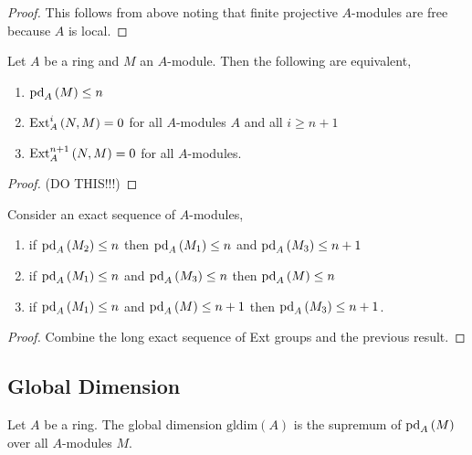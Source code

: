 \documentclass[12pt]{article}
\begin{document}
\begin{proof}
This follows from above noting that finite projective $A$-modules are free because $A$ is local.
\end{proof}

\begin{prop}
Let $A$ be a ring and $M$ an $A$-module. Then the following are equivalent,
\begin{enumerate}
\item $\mathrm{pd}_{A} \left( M \right) \le n$
\item $\mathrm{Ext}^{i}_{A} \left( N, M \right) = 0$ for all $A$-modules $A$ and all $i \ge n + 1$
\item $\mathrm{Ext}^{n+1}_{A} \left( N, M \right) = 0$ for all $A$-modules.
\end{enumerate}
\end{prop}

\begin{proof}
(DO THIS!!!)
\end{proof}

\begin{lemma}
Consider an exact sequence of $A$-modules,
\begin{center}
\end{center}
\begin{enumerate}
\item if $\mathrm{pd}_{A} \left( M_2 \right) \le n$ then $\mathrm{pd}_{A} \left( M_1 \right) \le n$ and $\mathrm{pd}_{A} \left( M_3 \right) \le n + 1$
\item if $\mathrm{pd}_{A} \left( M_1 \right) \le n$ and $\mathrm{pd}_{A} \left( M_3 \right) \le n$ then $\mathrm{pd}_{A} \left( M \right) \le n$
\item if $\mathrm{pd}_{A} \left( M_1 \right) \le n$ and $\mathrm{pd}_{A} \left( M \right) \le n + 1$ then $\mathrm{pd}_{A} \left( M_3 \right) \le n + 1$.
\end{enumerate}
\end{lemma}

\begin{proof}
Combine the long exact sequence of Ext groups and the previous result.
\end{proof}

\subsection{Global Dimension}

\newcommand{\gldim}[1]{\mathrm{gldim}\left( #1 \right)}

\begin{defn}
Let $A$ be a ring. The global dimension $\gldim{A}$ is the supremum of $\mathrm{pd}_{A} \left( M \right)$ over all $A$-modules $M$.
\end{defn}
\end{document}
